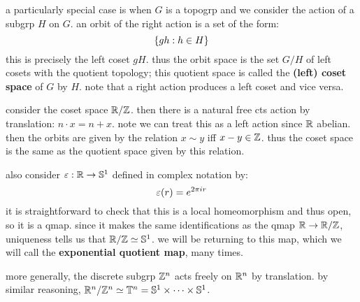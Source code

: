 a particularly special case is when $G$ is a topogrp and we consider the action
of a subgrp $H$ on $G$. an orbit of the right action is a set of the form:
\begin{equation*}
    \left\{{gh:h\in H}\right\}
\end{equation*}
this is precisely the left coset $gH$. thus the orbit space is the set $G/H$ of
left cosets with the quotient topology; this quotient space is called the
\textbf{(left) coset space} of $G$ by $H$. note that a right action produces a
left coset and vice versa.

\begin{xmp}[source=Primary Source Material]
    consider the coset space $\mathbb{R}/\mathbb{Z}$. then there is a natural free cts action
    by translation: $n\cdot x=n+x$. note we can treat this as a left action since
    $\mathbb{R}$ abelian. then the orbits are given by the relation $x\sim y$ iff
    $x-y\in\mathbb{Z}$. thus the coset space is the same as the quotient space given by
    this relation.

    also consider $\varepsilon:\mathbb{R}\rightarrow\mathbb{S}^{1}$ defined in complex notation by:
    \begin{equation*}
        \varepsilon(r)=e^{2\pi ir}
    \end{equation*}
    it is straightforward to check that this is a local homeomorphism and thus
    open, so it is a qmap. since it makes the same identifications as the qmap
    $\mathbb{R}\rightarrow\mathbb{R}/\mathbb{Z}$, uniqueness tells us that $\mathbb{R}/\mathbb{Z}\simeq\mathbb{S}^{1}$.
    we will be returning to this map, which we will call the \textbf{exponential
    quotient map}, many times.
\end{xmp}
more generally, the discrete subgrp $\mathbb{Z}^{n}$ acts freely on $\mathbb{R}^{n}$ by
translation. by similar reasoning, $\mathbb{R}^{n}/\mathbb{Z}^{n}\simeq\mathbb{T}^{n} =
\mathbb{S}^{1}\times\cdots\times\mathbb{S}^{1}$.

